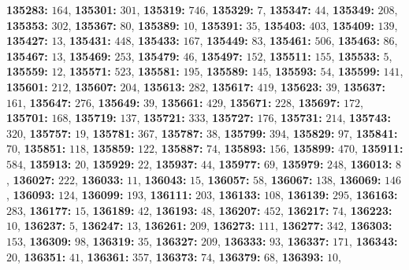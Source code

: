 \textsf{\bfseries 135283:} $164$, \textsf{\bfseries 135301:} $301$, \textsf{\bfseries 135319:} $746$, \textsf{\bfseries 135329:} $7$, \textsf{\bfseries 135347:} $44$, \textsf{\bfseries 135349:} $208$, \textsf{\bfseries 135353:} $302$, \textsf{\bfseries 135367:} $80$, \textsf{\bfseries 135389:} $10$, \textsf{\bfseries 135391:} $35$, \textsf{\bfseries 135403:} $403$, \textsf{\bfseries 135409:} $139$, \textsf{\bfseries 135427:} $13$, \textsf{\bfseries 135431:} $448$, \textsf{\bfseries 135433:} $167$, \textsf{\bfseries 135449:} $83$, \textsf{\bfseries 135461:} $506$, \textsf{\bfseries 135463:} $86$, \textsf{\bfseries 135467:} $13$, \textsf{\bfseries 135469:} $253$, \textsf{\bfseries 135479:} $46$, \textsf{\bfseries 135497:} $152$, \textsf{\bfseries 135511:} $155$, \textsf{\bfseries 135533:} $5$, \textsf{\bfseries 135559:} $12$, \textsf{\bfseries 135571:} $523$, \textsf{\bfseries 135581:} $195$, \textsf{\bfseries 135589:} $145$, \textsf{\bfseries 135593:} $54$, \textsf{\bfseries 135599:} $141$, \textsf{\bfseries 135601:} $212$, \textsf{\bfseries 135607:} $204$, \textsf{\bfseries 135613:} $282$, \textsf{\bfseries 135617:} $419$, \textsf{\bfseries 135623:} $39$, \textsf{\bfseries 135637:} $161$, \textsf{\bfseries 135647:} $276$, \textsf{\bfseries 135649:} $39$, \textsf{\bfseries 135661:} $429$, \textsf{\bfseries 135671:} $228$, \textsf{\bfseries 135697:} $172$, \textsf{\bfseries 135701:} $168$, \textsf{\bfseries 135719:} $137$, \textsf{\bfseries 135721:} $333$, \textsf{\bfseries 135727:} $176$, \textsf{\bfseries 135731:} $214$, \textsf{\bfseries 135743:} $320$, \textsf{\bfseries 135757:} $19$, \textsf{\bfseries 135781:} $367$, \textsf{\bfseries 135787:} $38$, \textsf{\bfseries 135799:} $394$, \textsf{\bfseries 135829:} $97$, \textsf{\bfseries 135841:} $70$, \textsf{\bfseries 135851:} $118$, \textsf{\bfseries 135859:} $122$, \textsf{\bfseries 135887:} $74$, \textsf{\bfseries 135893:} $156$, \textsf{\bfseries 135899:} $470$, \textsf{\bfseries 135911:} $584$, \textsf{\bfseries 135913:} $20$, \textsf{\bfseries 135929:} $22$, \textsf{\bfseries 135937:} $44$, \textsf{\bfseries 135977:} $69$, \textsf{\bfseries 135979:} $248$, \textsf{\bfseries 136013:} $8$, \textsf{\bfseries 136027:} $222$, \textsf{\bfseries 136033:} $11$, \textsf{\bfseries 136043:} $15$, \textsf{\bfseries 136057:} $58$, \textsf{\bfseries 136067:} $138$, \textsf{\bfseries 136069:} $146$, \textsf{\bfseries 136093:} $124$, \textsf{\bfseries 136099:} $193$, \textsf{\bfseries 136111:} $203$, \textsf{\bfseries 136133:} $108$, \textsf{\bfseries 136139:} $295$, \textsf{\bfseries 136163:} $283$, \textsf{\bfseries 136177:} $15$, \textsf{\bfseries 136189:} $42$, \textsf{\bfseries 136193:} $48$, \textsf{\bfseries 136207:} $452$, \textsf{\bfseries 136217:} $74$, \textsf{\bfseries 136223:} $10$, \textsf{\bfseries 136237:} $5$, \textsf{\bfseries 136247:} $13$, \textsf{\bfseries 136261:} $209$, \textsf{\bfseries 136273:} $111$, \textsf{\bfseries 136277:} $342$, \textsf{\bfseries 136303:} $153$, \textsf{\bfseries 136309:} $98$, \textsf{\bfseries 136319:} $35$, \textsf{\bfseries 136327:} $209$, \textsf{\bfseries 136333:} $93$, \textsf{\bfseries 136337:} $171$, \textsf{\bfseries 136343:} $20$, \textsf{\bfseries 136351:} $41$, \textsf{\bfseries 136361:} $357$, \textsf{\bfseries 136373:} $74$, \textsf{\bfseries 136379:} $68$, \textsf{\bfseries 136393:} $10$, 
